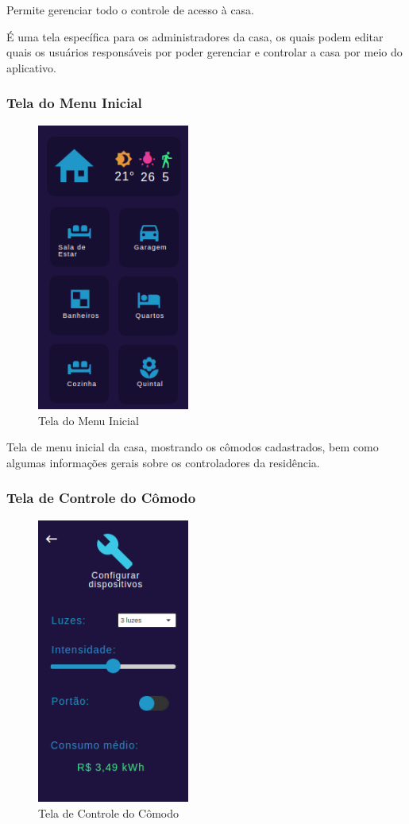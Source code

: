 \par Permite gerenciar todo o controle de acesso à casa.
\par É uma tela específica para os administradores da casa, os quais podem editar quais os usuários responsáveis por poder gerenciar e controlar a casa por meio do aplicativo.

\subsubsection{Tela do Menu Inicial}

\begin{figure}[!h]
\centering
\caption{Tela do Menu Inicial}
\includegraphics[width=5cm]{figuras/menu_inicial}
\end{figure}

\par Tela de menu inicial da casa, mostrando os cômodos cadastrados, bem como algumas informações gerais sobre os controladores da residência.

\subsubsection{Tela de Controle do Cômodo}

\begin{figure}[!h]
\centering
\caption{Tela de Controle do Cômodo}
\includegraphics[width=5cm]{figuras/controle_comodo}
\end{figure}

